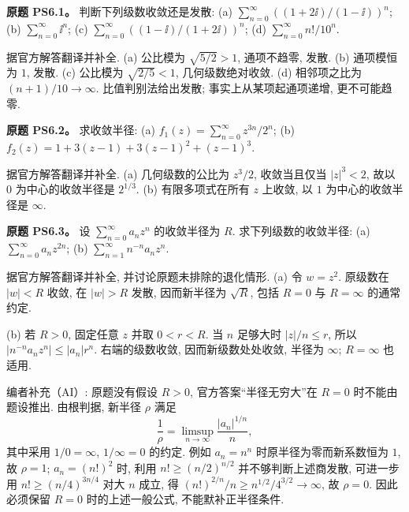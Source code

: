 
\begin{exercise}
\textbf{原题 PS6.1。}\label{ass:ps6-1}
判断下列级数收敛还是发散:
(a) $\sum_{n=0}^\infty((1+2\ii)/(1-\ii))^n$;
(b) $\sum_{n=0}^\infty\ii^n$;
(c) $\sum_{n=0}^\infty((1-\ii)/(1+2\ii))^n$;
(d) $\sum_{n=0}^\infty n!/10^n$.
\end{exercise}
\begin{solution}
据官方解答翻译并补全.
(a) 公比模为 $\sqrt{5/2}>1$, 通项不趋零, 发散.
(b) 通项模恒为 $1$, 发散.
(c) 公比模为 $\sqrt{2/5}<1$, 几何级数绝对收敛.
(d) 相邻项之比为 $(n+1)/10\to\infty$. 比值判别法给出发散; 事实上从某项起通项递增, 更不可能趋零.
\end{solution}

\begin{exercise}
\textbf{原题 PS6.2。}\label{ass:ps6-2}
求收敛半径:
(a) $f_1(z)=\sum_{n=0}^\infty z^{3n}/2^n$;
(b) $f_2(z)=1+3(z-1)+3(z-1)^2+(z-1)^3$.
\end{exercise}
\begin{solution}
据官方解答翻译并补全.
(a) 几何级数的公比为 $z^3/2$, 收敛当且仅当 $|z|^3<2$, 故以 $0$ 为中心的收敛半径是 $2^{1/3}$.
(b) 有限多项式在所有 $z$ 上收敛, 以 $1$ 为中心的收敛半径是 $\infty$.
\end{solution}

\begin{exercise}
\textbf{原题 PS6.3。}\label{ass:ps6-3}
设 $\sum_{n=0}^\infty a_nz^n$ 的收敛半径为 $R$. 求下列级数的收敛半径:
(a) $\sum_{n=0}^\infty a_nz^{2n}$;
(b) $\sum_{n=1}^\infty n^{-n}a_nz^n$.
\end{exercise}
\begin{solution}
据官方解答翻译并补全, 并讨论原题未排除的退化情形.
(a) 令 $w=z^2$. 原级数在 $|w|<R$ 收敛, 在 $|w|>R$ 发散, 因而新半径为 $\sqrt R$, 包括 $R=0$ 与 $R=\infty$ 的通常约定.

(b) 若 $R>0$, 固定任意 $z$ 并取 $0<r<R$. 当 $n$ 足够大时 $|z|/n\le r$, 所以 $|n^{-n}a_nz^n|\le |a_n|r^n$. 右端的级数收敛, 因而新级数处处收敛, 半径为 $\infty$; $R=\infty$ 也适用.

编者补充（AI）: 原题没有假设 $R>0$, 官方答案“半径无穷大”在 $R=0$ 时不能由题设推出. 由根判据, 新半径 $\rho$ 满足
\[
 \frac1\rho=\limsup_{n\to\infty}\frac{|a_n|^{1/n}}n,
\]
其中采用 $1/0=\infty$, $1/\infty=0$ 的约定. 例如 $a_n=n^n$ 时原半径为零而新系数恒为 $1$, 故 $\rho=1$; $a_n=(n!)^2$ 时, 利用 $n!\ge(n/2)^{n/2}$ 并不够判断上述商发散, 可进一步用 $n!\ge(n/4)^{3n/4}$ 对大 $n$ 成立, 得 $(n!)^{2/n}/n\ge n^{1/2}/4^{3/2}\to\infty$, 故 $\rho=0$. 因此必须保留 $R=0$ 时的上述一般公式, 不能默补正半径条件.
\end{solution}

